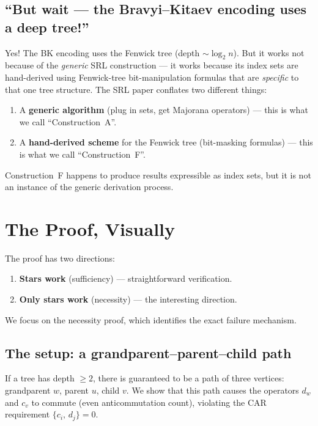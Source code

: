 \documentclass[11pt,a4paper]{article}
\newcommand{\acomm}[2]{\{#1,\,#2\}}
\theoremstyle{definition}
\begin{document}
\subsection{``But wait --- the Bravyi--Kitaev encoding uses a deep tree!''}

Yes!  The BK encoding uses the Fenwick tree (depth $\sim \log_2 n$).
But it works not because of the \emph{generic} SRL construction ---
it works because its index sets are hand-derived using Fenwick-tree
bit-manipulation formulas that are \emph{specific} to that one tree
structure.  The SRL paper conflates two different things:

\begin{enumerate}
  \item A \textbf{generic algorithm} (plug in sets, get Majorana
    operators) --- this is what we call ``Construction~A''.
  \item A \textbf{hand-derived scheme} for the Fenwick tree
    (bit-masking formulas) --- this is what we call ``Construction~F''.
\end{enumerate}

Construction~F happens to produce results expressible as index sets,
but it is not an instance of the generic derivation process.

\section{The Proof, Visually}
\label{sec:proof}

The proof has two directions:

\begin{enumerate}
  \item \textbf{Stars work} (sufficiency) --- straightforward
    verification.
  \item \textbf{Only stars work} (necessity) --- the interesting
    direction.
\end{enumerate}

We focus on the necessity proof, which identifies the exact failure
mechanism.

\subsection{The setup: a grandparent--parent--child path}

If a tree has depth $\ge 2$, there is guaranteed to be a path of three
vertices: grandparent $w$, parent $u$, child $v$.  We show that this
path causes the operators $d_w$ and $c_v$ to commute (even
anticommutation count), violating the CAR requirement
$\acomm{c_i}{d_j} = 0$.
\end{document}
